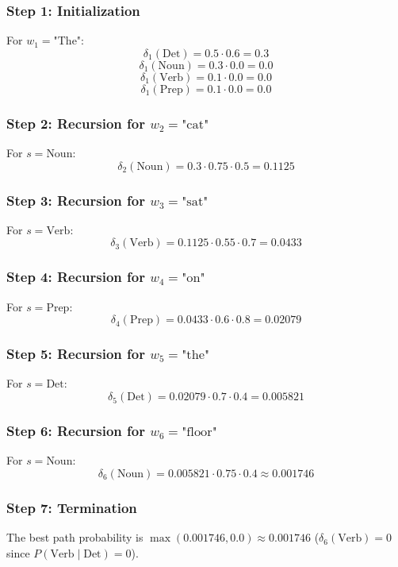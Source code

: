 \begin{notechapter}
\subsubsection{Step 1: Initialization}
For \( w_1 = \text{"The"} \):
\[
\delta_1(\text{Det}) = 0.5 \cdot 0.6 = 0.3
\]
\[
\delta_1(\text{Noun}) = 0.3 \cdot 0.0 = 0.0
\]
\[
\delta_1(\text{Verb}) = 0.1 \cdot 0.0 = 0.0
\]
\[
\delta_1(\text{Prep}) = 0.1 \cdot 0.0 = 0.0
\]

\subsubsection{Step 2: Recursion for \( w_2 = \text{"cat"} \)}
For \( s = \text{Noun} \):
\[
\delta_2(\text{Noun}) = 0.3 \cdot 0.75 \cdot 0.5 = 0.1125
\]

\subsubsection{Step 3: Recursion for \( w_3 = \text{"sat"} \)}
For \( s = \text{Verb} \):
\[
\delta_3(\text{Verb}) = 0.1125 \cdot 0.55 \cdot 0.7 = 0.0433
\]

\subsubsection{Step 4: Recursion for \( w_4 = \text{"on"} \)}
For \( s = \text{Prep} \):
\[
\delta_4(\text{Prep}) = 0.0433 \cdot 0.6 \cdot 0.8 = 0.02079
\]

\subsubsection{Step 5: Recursion for \( w_5 = \text{"the"} \)}
For \( s = \text{Det} \):
\[
\delta_5(\text{Det}) = 0.02079 \cdot 0.7 \cdot 0.4 = 0.005821
\]

\subsubsection{Step 6: Recursion for \( w_6 = \text{"floor"} \)}
For \( s = \text{Noun} \):
\[
\delta_6(\text{Noun}) = 0.005821 \cdot 0.75 \cdot 0.4 \approx 0.001746
\]

\subsubsection{Step 7: Termination}
The best path probability is \( \max(0.001746, 0.0) \approx 0.001746 \) (\( \delta_6(\text{Verb}) = 0 \) since \( P(\text{Verb} \mid \text{Det}) = 0 \)).


\end{notechapter}
